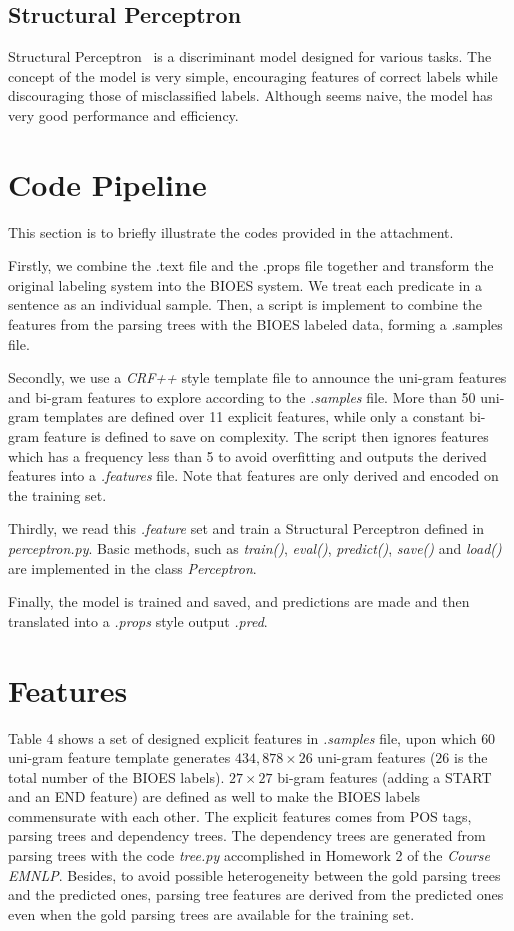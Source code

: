 \documentclass[11pt,a4paper]{article}
\begin{document}
\subsection{Structural Perceptron}
Structural Perceptron~\cite{SP} is a discriminant model designed for various tasks. The concept of the model is very simple, encouraging features of correct labels while discouraging those of misclassified labels. Although seems naive, the model has very good performance and efficiency.

\section{Code Pipeline}
This section is to briefly illustrate the codes provided in the attachment.

Firstly, we combine the .text file and the .props file together and transform the original labeling system into the BIOES system. We treat each predicate in a sentence as an individual sample. Then, a script is implement to combine the features from the parsing trees with the BIOES labeled data, forming a .samples file.

Secondly, we use a \textit{CRF++} style template file to announce the uni-gram features and bi-gram features to explore according to the \textit{.samples} file. More than 50 uni-gram templates are defined over 11 explicit features, while only a constant bi-gram feature is defined to save on complexity. The script then ignores features which has a frequency less than 5 to avoid overfitting and outputs the derived features into a \textit{.features} file. Note that features are only derived and encoded on the training set.

Thirdly, we read this \textit{.feature} set and train a Structural Perceptron defined in \textit{perceptron.py}. Basic methods, such as \textit{train()}, \textit{eval()}, \textit{predict()}, \textit{save()} and \textit{load()} are implemented in the class \textit{Perceptron}.

Finally, the model is trained and saved, and predictions are made and then translated into a \textit{.props} style output \textit{.pred}.

\section{Features}

Table 4 shows a set of designed explicit features in \textit{.samples} file, upon which $60$ uni-gram feature template generates $434,878 \times 26$ uni-gram features ($26$ is the total number of the BIOES labels). $27 \times 27$ bi-gram features (adding a START and an END feature) are defined as well to make the BIOES labels commensurate with each other. The explicit features comes from POS tags, parsing trees and dependency trees. The dependency trees are generated from parsing trees with the code \textit{tree.py} accomplished in Homework 2 of the \textit{Course EMNLP}. Besides, to avoid possible heterogeneity between the gold parsing trees and the predicted ones, parsing tree features are derived from the predicted ones even when the gold parsing trees are available for the training set.
\end{document}
